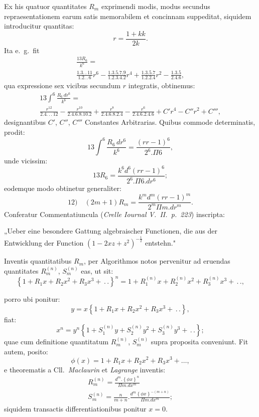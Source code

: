 \documentclass{article}
\begin{document}
Ex his quatuor quantitates $R_{m}$ exprimendi modis, modus secundus repraesentationem earum satis memorabilem et concinnam suppeditat, siquidem introducitur quantitas:
\[
r=\frac{1+kk}{2k}.
\]
Ita e.\ g.\ fit
\[
\begin{gathered}
\frac{13R_{6}}{k^{6}}=\\[1.5ex]
\frac{1.3.\,.\,11}{1.2.\,.\,6}r^{6}-\frac{1.3.5.7.9}{1.2.3.4.2}r^{4}+\frac{1.3.5.7}{1.2.2.4}r^{2}-\frac{1.3.5}{2.4.6},
\end{gathered}
\]
qua expressione sex vicibus secundum $r$ integratis, obtinemus:
\[
\begin{gathered}
13\int^{6}\frac{R_{6}\,dr^{6}}{k^{6}}=\\[1.5ex]
\frac{r^{12}}{2.4.\,.\,.\,12}-\frac{r^{10}}{2.4.6.8.10.2}+\frac{r^{8}}{2.4.6.8.2.4}-\frac{r^{6}}{2.4.6.2.4.6}+C'r^{4}-C''r^{2}+C''',
\end{gathered}
\]
designantibus $C'$, $C''$, $C'''$ Constantes Arbitrarias. Quibus commode determinatis, prodit:
\[
13\int^{6}\frac{R_{6}\,dr^{6}}{k^{6}}=\frac{(rr-1)^{6}}{2^{6}.\Pi 6},
\]
unde vicissim:
\[
13R_{6}=\frac{k^{6}d^{6}(rr-1)^{6}}{2^{6}.\Pi 6.dr^{6}};
\]
eodemque modo obtinetur generaliter:
\[
\text{12)}\quad(2m+1)R_{m}=\frac{k^{m}d^{m}(rr-1)^{m}}{2^{m}\Pi m.dr^{m}}.
\]
Conferatur Commentatiuncula (\emph{Crelle Iournal V.\ II.\ p.\ 223}) inscripta:

„Ueber eine besondere Gattung algebraischer Functionen, die aus der Entwicklung der Function $(1-2xz+z^{2})^{-\frac{1}{2}}$ entstehn."

Inventis quantitatibus $R_{m}$, per Algorithmos notos pervenitur ad eruendas quantitates $R_{m}^{(n)}$, $S_{m}^{(n)}$ eas, ut sit:
\[
\left\{1+R_{1}x+R_{2}x^{2}+R_{3}x^{3}+\,.\,.\right\}^{n}=1+R_{1}^{(n)}x+R_{2}^{(n)}x^{2}+R_{3}^{(n)}x^{3}+\,.\,.,
\]

porro ubi ponitur:
\[
y=x\left\{1+R_{1}x+R_{2}x^{2}+R_{3}x^{3}+\,.\,.\right\},
\]
fiat:
\[
x^{n}=y^{n}\left\{1+S_{1}^{(n)}y+S_{2}^{(n)}y^{2}+S_{3}^{(n)}y^{3}+\,.\,.\right\};
\]
quae cum definitione quantitatum $R_{m}^{(n)}$, $S_{m}^{(n)}$ supra proposita conveniunt. Fit autem, posito:
\[
\phi(x)=1+R_{1}x+R_{2}x^{2}+R_{3}x^{3}+\ldots,
\]
e theorematis a Cll.\ \emph{Maclaurin} et \emph{Lagrange} inventis:
\[
\begin{gathered}
R_{m}^{(n)}=\frac{d^{m}.\left\{\phi x\right\}^{n}}{\Pi m.dx^{m}}\\[1.5ex]
S_{m}^{(n)}=\frac{n}{m+n}.\frac{d^{m}\left\{\phi x\right\}^{-(m+n)}}{\Pi m.dx^{m}};
\end{gathered}
\]
siquidem transactis differentiationibus ponitur $x=0$.
\end{document}
